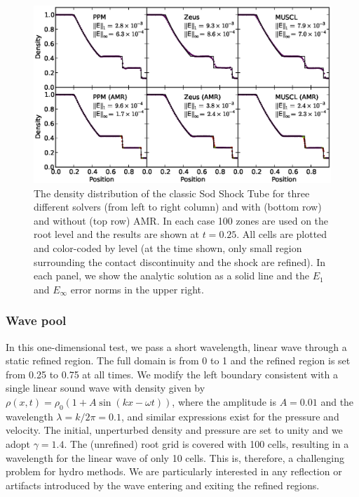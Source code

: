 \begin{figure}
\begin{center}
\includegraphics[width=\textwidth]{figures/SodShockTube.eps}
\caption{The density distribution of the classic Sod Shock Tube for
three different solvers (from left to right column) and with (bottom
row) and without (top row) AMR.  In each case 100 zones are used on
the root level and the results are shown at $t=0.25$.  All cells are
plotted and color-coded by level (at the time shown, only small region
surrounding the contact discontinuity and the shock are refined).  In
each panel, we show the analytic solution as a solid line and the $E_1$
and $E_\infty$ error norms in the upper right.}
\label{fig.sodshocktube}
\end{center}
\end{figure}


\subsubsection{Wave pool}
\label{sec.tests.wavepool}

In this one-dimensional test, we pass a short wavelength, linear wave through a static refined region.  The full domain is from 0 to 1 and the refined region is set from 0.25 to 0.75 at all times.  We modify the left boundary consistent with a single linear sound wave with density given by $\rho(x,t) = \rho_0 (1 + A \sin(kx - \omega t))$, where the amplitude is $A = 0.01$ and the wavelength $\lambda = k/2\pi = 0.1$, and similar expressions exist for the pressure and velocity.  The initial, unperturbed density and pressure are set to unity and we adopt $\gamma = 1.4$.  The (unrefined) root grid is covered with 100 cells, resulting in a wavelength for the linear wave of only 10 cells.  This is, therefore, a challenging problem for hydro methods.  We are particularly interested in any reflection or artifacts introduced by the wave entering and exiting the refined regions.

